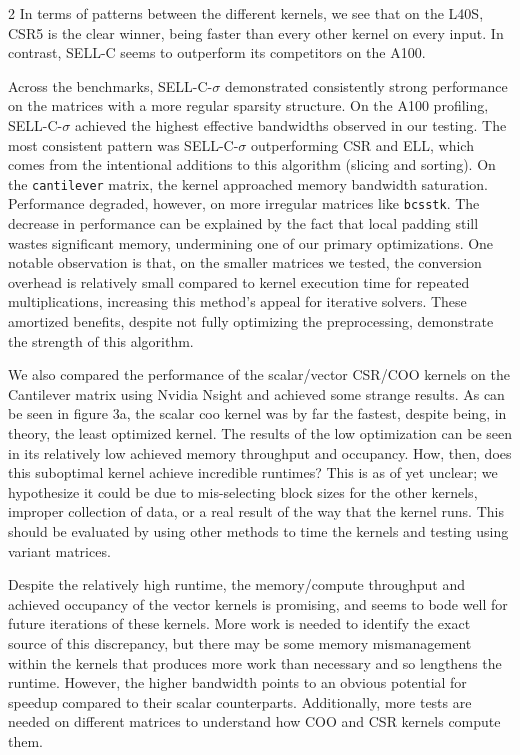 \documentclass{article}
\begin{document}
\begin{multicols}{2}
In terms of patterns between the different kernels, we see that on the L40S, CSR5 is the clear winner, being faster than every other kernel on every input. In contrast, SELL-C seems to outperform its competitors on the A100. 

Across the benchmarks, SELL-C-$\sigma$ demonstrated consistently strong performance on the matrices with a more regular sparsity structure. On the A100 profiling, SELL-C-$\sigma$ achieved the highest effective bandwidths observed in our testing. The most consistent pattern was SELL-C-$\sigma$ outperforming CSR and ELL, which comes from the intentional additions to this algorithm (slicing and sorting). On the \texttt{cantilever} matrix, the kernel approached memory bandwidth saturation. Performance degraded, however, on more irregular matrices like \texttt{bcsstk}. The decrease in performance can be explained by the fact that local padding still wastes significant memory, undermining one of our primary optimizations. One notable observation is that, on the smaller matrices we tested, the conversion overhead is relatively small compared to kernel execution time for repeated multiplications, increasing this method’s appeal for iterative solvers. These amortized benefits, despite not fully optimizing the preprocessing, demonstrate the strength of this algorithm.

We also compared the performance of the scalar/vector CSR/COO kernels on the Cantilever matrix using Nvidia Nsight and achieved some strange results. As can be seen in figure 3a, the scalar coo kernel was by far the fastest, despite being, in theory, the least optimized kernel. The results of the low optimization can be seen in its relatively low achieved memory throughput and occupancy. How, then, does this suboptimal kernel achieve incredible runtimes? This is as of yet unclear; we hypothesize it could be due to mis-selecting block sizes for the other kernels, improper collection of data, or a real result of the way that the kernel runs. This should be evaluated by using other methods to time the kernels and testing using variant matrices. 

Despite the relatively high runtime, the memory/compute throughput and achieved occupancy of the vector kernels is promising, and seems to bode well for future iterations of these kernels. More work is needed to identify the exact source of this discrepancy, but there may be some memory mismanagement within the kernels that produces more work than necessary and so lengthens the runtime. However, the higher bandwidth points to an obvious potential for speedup compared to their scalar counterparts. Additionally, more tests are needed on different matrices to understand how COO and CSR kernels compute them. 


\end{multicols}
\end{document}
